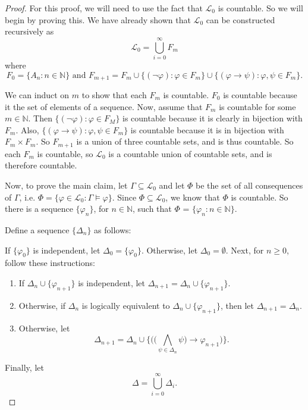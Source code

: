 \documentclass[12pt]{article}
\newcommand{\N}{\mathbb{N}}
\begin{document}
\begin{proof}

For this proof, we will need to use the fact that $\mathcal{L}_0$ is countable.  So we will begin by proving this.  We have already shown that $\mathcal{L}_0$ can be constructed recursively as $$\mathcal{L}_0 = \bigcup_{i=0}^\infty F_m$$ where $$F_0 = \{ A_n : n \in \N \} \textrm{ \ \ \ \ and \ \ \ \ \ } F_{m+1} = F_m \cup \{ (\neg \varphi ) : \varphi \in F_m \} \cup \{ (\varphi \to \psi) : \varphi, \psi \in F_m \}.$$

We can induct on $m$ to show that each $F_m$ is countable.  $F_0$ is countable because it the set of elements of a sequence.  Now, assume that $F_m$ is countable for some $m \in \N$.  Then $\{ (\neg \varphi ) : \varphi \in F_M \}$ is countable because it is clearly in bijection with $F_m$.  Also, $\{ (\varphi \to \psi) : \varphi, \psi \in F_m \}$ is countable because it is in bijection with $F_m \times F_m$.  So $F_{m+1}$ is a union of three countable sets, and is thus countable.  So each $F_m$ is countable, so $\mathcal{L}_0$ is a countable union of countable sets, and is therefore countable.

Now, to prove the main claim, let $\Gamma \subseteq \mathcal{L}_0$ and let $\Phi$ be the set of all consequences of $\Gamma$, i.e. $\Phi = \{ \varphi \in \mathcal{L}_0 : \Gamma \models \varphi \}$.  Since $\Phi \subseteq \mathcal{L}_0$, we know that $\Phi$ is countable.  So there is a sequence $\{ \varphi_n \}$, for $n \in \N$, such that $\Phi$ = $\{ \varphi_n : n \in \N \}$.

Define a sequence $\{ \Delta_n \}$ as follows:

If $\{ \varphi_0 \}$ is independent, let $\Delta_0 = \{ \varphi_0 \}$.  Otherwise, let $\Delta_0 = \emptyset$.  Next, for $n \geq 0$, follow these instructions:

\begin{enumerate}
\item If $\Delta_n \cup \{\varphi_{n+1} \}$ is independent, let $\Delta_{n+1} = \Delta_n \cup \{\varphi_{n+1} \}$.
\item Otherwise, if $\Delta_n$ is logically equivalent to $\Delta_n \cup \{\varphi_{n+1} \}$, then let $\Delta_{n+1} = \Delta_n$.
\item Otherwise, let $$\Delta_{n+1} = \Delta_n \cup \Big \{ \Big( \Big( \bigwedge_{\psi \in \Delta_n} \psi \Big) \to \varphi_{n+1} \Big) \Big \}.$$
\end{enumerate}

Finally, let $$\Delta = \bigcup_{i=0}^\infty \Delta_i.$$


\end{proof}
\end{document}
